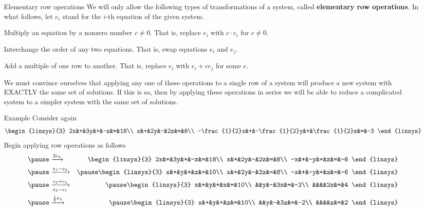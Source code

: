 \begin{frame}{Elementary row operations}
We will only allow the following types of transformations of a system, called {\bf elementary row operations}. In what follows, let $e_i$ stand for the $i$-th equation of the given system.
\begin{description}
\pause\item[Scalar mult.] Multiply an equation by a \alert{nonzero} number $c\ne 0$. That is, replace $e_i$ with $c\cdot e_i$ for $c\ne 0$. 
\pause\item[Swap] Interchange the order of any two equations. That is, swap equations $e_i$ and $e_j$. 
\pause\item[Addition] Add a multiple of one row to another. That is, replace $e_i$ with $e_i+ce_j$ for some $c$.    
\end{description}
\pause We must convince ourselves that applying any one of these operations to a single row of a system will produce a new system with \alert{EXACTLY} the same set of solutions.
\bpause If this is so, then by applying these operations in series we will be able to reduce a complicated system to a simpler system with the same set of solutions. 
\end{frame}
\begin{frame}{Example}
Consider again 
\[
\begin{linsys}{3}
2x&+&3y&+&-z&=&18\\
x&+&2y&-&2z&=&8\\
-\frac{1}{2}x&+&-\frac{1}{2}y&+&\frac{1}{2}z&=&-3
\end{linsys}
\]
Begin applying row operations as follows
\begin{eqnarray*}
\pause&\xrightarrow[]{2e_3}&\begin{linsys}{3}
2x&+&3y&+&-z&=&18\\
x&+&2y&-&2z&=&8\\
-x&+&-y&+&z&=&-6
\end{linsys}\\
\pause&\xrightarrow[]{e_1-e_2}&\pause\begin{linsys}{3}
x&+&y&+&z&=&10\\
x&+&2y&-&2z&=&8\\
-x&+&-y&+&z&=&-6
\end{linsys}\\
\pause&\xrightarrow[e_2-e_1]{e_3+e_1}&\pause
\begin{linsys}{3}
x&+&y&+&z&=&10\\
&&y&-&3z&=&-2\\
&&&&2z&=&4
\end{linsys}\\
\pause&\xrightarrow[]{\frac{1}{2}e_3}&
\pause\begin{linsys}{3}
x&+&y&+&z&=&10\\
&&y&-&3z&=&-2\\
&&&&z&=&2
\end{linsys}
\end{eqnarray*}

\end{frame}
